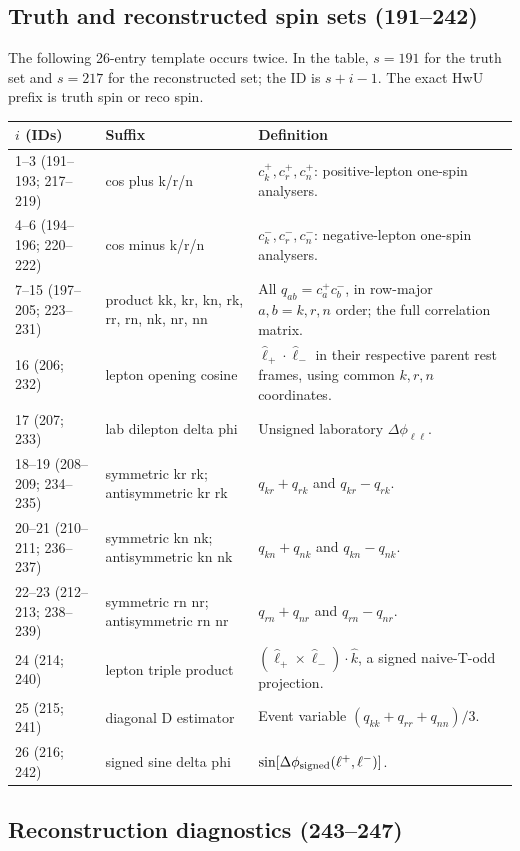 \documentclass[10pt,a4paper]{article}
\newcommand{\ddphi}{\Delta\phi}
\newcommand{\lplus}{\ell^+}
\newcommand{\lminus}{\ell^-}
\newcommand{\hist}[1]{\textsf{#1}}
\begin{document}
\subsection{Truth and reconstructed spin sets (191--242)}

The following 26-entry template occurs twice.  In the table, \(s=191\) for
the truth set and \(s=217\) for the reconstructed set; the ID is
\(s+i-1\).  The exact HwU prefix is \hist{truth spin} or \hist{reco spin}.

\begin{longtable}{L{1.3cm}L{5.6cm}L{8.9cm}}
\toprule \(i\) (IDs) & Suffix & Definition\\ \midrule{}--3 (191--193; 217--219) & \hist{cos plus k/r/n} & \(c_k^+,c_r^+,c_n^+\): positive-lepton one-spin analysers.\\
4--6 (194--196; 220--222) & \hist{cos minus k/r/n} & \(c_k^-,c_r^-,c_n^-\): negative-lepton one-spin analysers.\\
7--15 (197--205; 223--231) & \hist{product kk, kr, kn, rk, rr, rn, nk, nr, nn} & All \(q_{ab}=c_a^+c_b^-\), in row-major \(a,b=k,r,n\) order; the full correlation matrix.\\
16 (206; 232) & \hist{lepton opening cosine} & \(\hat\ell_+\cdot\hat\ell_-\) in their respective parent rest frames, using common \(k,r,n\) coordinates.\\
17 (207; 233) & \hist{lab dilepton delta phi} & Unsigned laboratory \(\ddphi_{\ell\ell}\).\\
18--19 (208--209; 234--235) & \hist{symmetric kr rk}; \hist{antisymmetric kr rk} & \(q_{kr}+q_{rk}\) and \(q_{kr}-q_{rk}\).\\
20--21 (210--211; 236--237) & \hist{symmetric kn nk}; \hist{antisymmetric kn nk} & \(q_{kn}+q_{nk}\) and \(q_{kn}-q_{nk}\).\\
22--23 (212--213; 238--239) & \hist{symmetric rn nr}; \hist{antisymmetric rn nr} & \(q_{rn}+q_{nr}\) and \(q_{rn}-q_{nr}\).\\
24 (214; 240) & \hist{lepton triple product} & \((\hat\ell_+\times\hat\ell_-)\cdot\hat k\), a signed naive-T-odd projection.\\
25 (215; 241) & \hist{diagonal D estimator} & Event variable \((q_{kk}+q_{rr}+q_{nn})/3\).\\
26 (216; 242) & \hist{signed sine delta phi} & \(\sin[\ddphi_{\rm signed}(\lplus,\lminus)]\).\\
\bottomrule
\end{longtable}

\subsection{Reconstruction diagnostics (243--247)}
\end{document}
